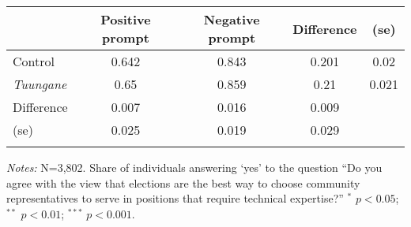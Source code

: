 \begin{tabular}{lcc|cc}  
 	& Positive prompt &	Negative prompt	&	Difference & (se)\\ \hline \hline  
 Control&0.642&0.843&0.201&0.02 \\  
 \textit{Tuungane}&0.65&0.859&0.21&0.021 \\  
 Difference&0.007&0.016&0.009& \\  
 (se)&0.025&0.019&0.029& \\  
 \hline \hline   
 \label{table_desirability}  
 \end{tabular}  
 \begin{flushleft} \textit{Notes:} N=3,802. 
  Share of individuals answering `yes' to the question ``Do you agree with the view that elections are the best way to choose community representatives
    to serve in positions that require technical expertise?'' $^*$ $p<0.05$; $^{**}$ $p<0.01$; $^{***}$ $p<0.001$. \end{flushleft}  
